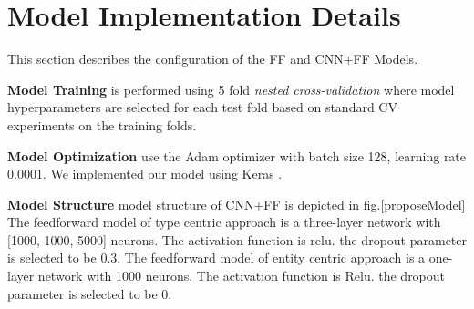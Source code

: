 \section{Model Implementation Details}
This section describes the configuration of the FF and CNN+FF Models.

\textbf{Model Training} is performed using 5 fold \textit{nested cross-validation} \cite{cawley2010over} where model hyperparameters are selected for each test fold based on standard CV experiments on the training folds.

\textbf{Model Optimization} use the Adam optimizer with batch size 128, learning rate 0.0001. We implemented our model using Keras \cite{chollet2015keras}.

\textbf{Model Structure} model structure of CNN+FF is depicted in fig.\ref{proposeModel} The feedforward model of type centric approach is a three-layer network with [1000, 1000, 5000] neurons. The activation function is relu. the dropout parameter is selected to be 0.3. The feedforward model of entity centric approach is a one-layer network with 1000 neurons. The activation function is Relu. the dropout parameter is selected to be 0.
